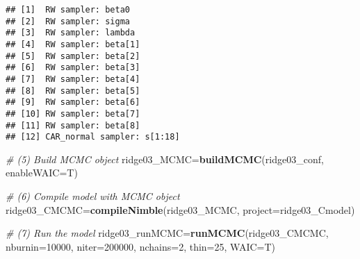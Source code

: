 \documentclass[]{article}
\newenvironment{Shaded}{\begin{snugshade}}{\end{snugshade}}
\newcommand{\CommentTok}[1]{\textcolor[rgb]{0.56,0.35,0.01}{\textit{#1}}}
\newcommand{\DataTypeTok}[1]{\textcolor[rgb]{0.13,0.29,0.53}{#1}}
\newcommand{\DecValTok}[1]{\textcolor[rgb]{0.00,0.00,0.81}{#1}}
\newcommand{\KeywordTok}[1]{\textcolor[rgb]{0.13,0.29,0.53}{\textbf{#1}}}
\newcommand{\NormalTok}[1]{#1}
\newcommand{\OperatorTok}[1]{\textcolor[rgb]{0.81,0.36,0.00}{\textbf{#1}}}
\newcommand{\StringTok}[1]{\textcolor[rgb]{0.31,0.60,0.02}{#1}}
\begin{document}
\begin{Shaded}
\end{Shaded}

\begin{verbatim}
## [1]  RW sampler: beta0
## [2]  RW sampler: sigma
## [3]  RW sampler: lambda
## [4]  RW sampler: beta[1]
## [5]  RW sampler: beta[2]
## [6]  RW sampler: beta[3]
## [7]  RW sampler: beta[4]
## [8]  RW sampler: beta[5]
## [9]  RW sampler: beta[6]
## [10] RW sampler: beta[7]
## [11] RW sampler: beta[8]
## [12] CAR_normal sampler: s[1:18]
\end{verbatim}

\begin{Shaded}
\begin{Highlighting}[]
\CommentTok{# (5) Build MCMC object}
\NormalTok{ridge03_MCMC=}\KeywordTok{buildMCMC}\NormalTok{(ridge03_conf, }\DataTypeTok{enableWAIC=}\NormalTok{T)}

\CommentTok{# (6) Compile model with MCMC object}
\NormalTok{ridge03_CMCMC=}\KeywordTok{compileNimble}\NormalTok{(ridge03_MCMC, }\DataTypeTok{project=}\NormalTok{ridge03_Cmodel)}

\CommentTok{# (7) Run the model}
\NormalTok{ridge03_runMCMC=}\KeywordTok{runMCMC}\NormalTok{(ridge03_CMCMC, }\DataTypeTok{nburnin=}\DecValTok{10000}\NormalTok{, }\DataTypeTok{niter=}\DecValTok{200000}\NormalTok{, }\DataTypeTok{nchains=}\DecValTok{2}\NormalTok{, }\DataTypeTok{thin=}\DecValTok{25}\NormalTok{, }\DataTypeTok{WAIC=}\NormalTok{T)}
\end{Highlighting}
\end{Shaded}
\end{document}
